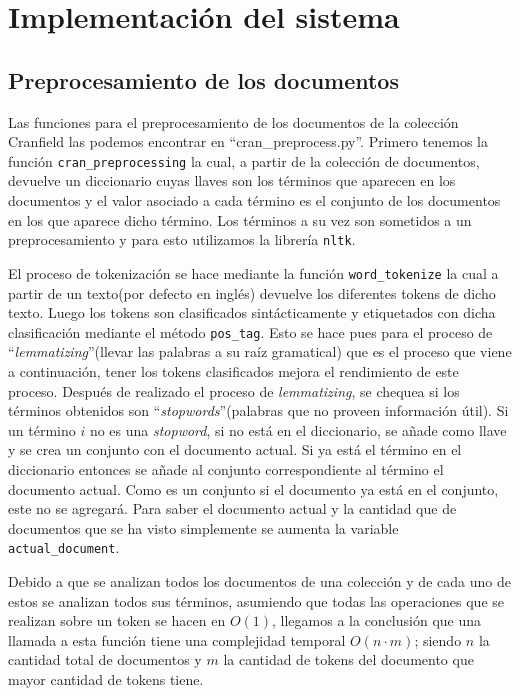\documentclass[runningheads]{llncs}
\begin{document}
	\section{Implementaci\'on del sistema}
	
	\subsection{Preprocesamiento de los documentos}
	
	Las funciones para el preprocesamiento de los documentos de la colecci\'on Cranfield las podemos encontrar en ``cran\_preprocess.py''. Primero tenemos la funci\'on \verb|cran_preprocessing| la cual, a partir de la colecci\'on de documentos, devuelve un diccionario cuyas llaves son los t\'erminos que aparecen en los documentos y el valor asociado a cada t\'ermino es el conjunto de los documentos en los que aparece dicho t\'ermino. Los t\'erminos a su vez son sometidos a un preprocesamiento y para esto utilizamos la librer\'ia \verb|nltk|.
	
	El proceso de tokenizaci\'on se hace mediante la funci\'on \verb|word_tokenize| la cual a partir de un texto(por defecto en ingl\'es) devuelve los diferentes tokens de dicho texto. Luego los tokens son clasificados sint\'acticamente y etiquetados con dicha clasificaci\'on mediante el m\'etodo \verb|pos_tag|. Esto se hace pues para el proceso de ``\textit{lemmatizing}''(llevar las palabras a su ra\'iz gramatical) que es el proceso que viene a continuaci\'on, tener los tokens clasificados mejora el rendimiento de este proceso. Despu\'es de realizado
	el proceso de \textit{lemmatizing}, se chequea si los t\'erminos obtenidos son ``\textit{stopwords}''(palabras que no proveen informaci\'on \'util). Si un t\'ermino $i$ no es una \textit{stopword}, si no est\'a en el diccionario, se a\~{n}ade como llave y se crea un conjunto con el documento actual. Si ya est\'a el t\'ermino en el diccionario entonces se a\~{n}ade al conjunto correspondiente al t\'ermino el documento actual. Como es un conjunto si el documento ya est\'a en el conjunto, este no se agregar\'a. Para saber el documento actual y la cantidad que de documentos que se ha visto simplemente se aumenta la variable \verb|actual_document|.
	
	Debido a que se analizan todos los documentos de una colecci\'on y de cada uno de estos se analizan todos sus t\'erminos, asumiendo que todas las operaciones que se realizan sobre un token se hacen en $O(1)$, llegamos a la conclusi\'on que una llamada a esta funci\'on tiene una complejidad temporal $O(n\cdot m)$; siendo $n$ la cantidad total de documentos y $m$ la cantidad de tokens del documento que mayor cantidad de tokens tiene.
	
\end{document}
